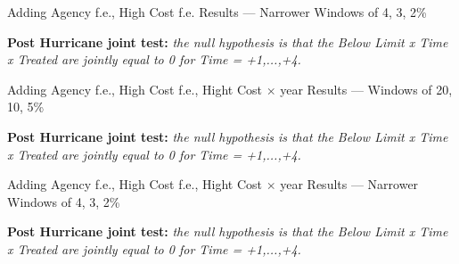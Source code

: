 \documentclass{article}
\begin{document}
\clearpage
\pagebreak
                
\begin{sidewaystable}
                    
    \caption{Adding Agency f.e., High Cost f.e. Results --- Narrower Windows of 4, 3, 2\%}
                    
    \begin{center}
    
    
\end{center}
                 
    \textbf{Post Hurricane joint test:} \emph{the null hypothesis is that the Below Limit x Time x Treated are jointly equal to 0 for Time = +1,...,+4.}
   
\end{sidewaystable}

\clearpage
\pagebreak
                
\begin{sidewaystable}
                    
    \caption{Adding Agency f.e., High Cost f.e., Hight Cost $\times$ year Results --- Windows of 20, 10, 5\%}
                    
    \begin{center}
    
    
\end{center}
                 
    \textbf{Post Hurricane joint test:} \emph{the null hypothesis is that the Below Limit x Time x Treated are jointly equal to 0 for Time = +1,...,+4.}
   
\end{sidewaystable}

\clearpage
\pagebreak

\begin{sidewaystable}
                    
    \caption{Adding Agency f.e., High Cost f.e., Hight Cost $\times$ year Results --- Narrower Windows of 4, 3, 2\%}
                    
    \begin{center}
    
    \end{center}
                
    \textbf{Post Hurricane joint test:} \emph{the null hypothesis is that the Below Limit x Time x Treated are jointly equal to 0 for Time = +1,...,+4.}
   
\end{sidewaystable}
\end{document}
